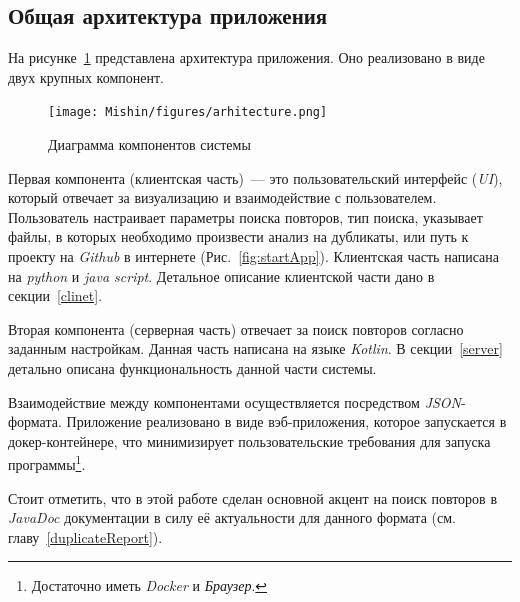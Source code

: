 

\subsection{Общая архитектура приложения}
На рисунке~\ref{fig:application} представлена архитектура приложения.
Оно реализовано в виде двух крупных компонент.

\begin{figure}[H]
    \texttt{[image: Mishin/figures/arhitecture.png]}
    \caption{Диаграмма компонентов системы}\label{fig:application}
\end{figure}


Первая компонента (клиентская часть)~--- это пользовательский интерфейс (\emph{UI}), который  отвечает за визуализацию и взаимодействие с пользователем.
Пользователь настраивает параметры поиска повторов, тип поиска, указывает файлы, в которых необходимо произвести анализ на дубликаты, или путь к проекту на \emph{Github} в интернете (Рис.~\ref{fig:startApp}).
Клиентская часть написана на \emph{python} и \emph{java script}.
Детальное описание клиентской части дано в секции~\ref{clinet}.

Вторая компонента (серверная часть) отвечает за поиск повторов согласно заданным настройкам.
Данная часть написана на языке \emph{Kotlin}.
В секции~\ref{server} детально описана функциональность данной части системы.

Взаимодействие между компонентами осуществляется посредством \emph{JSON}-формата.
Приложение реализовано в виде вэб-приложения, которое запускается в докер-контейнере, что минимизирует пользовательские требования для запуска программы\footnote{Достаточно иметь \emph{Docker} и \emph{Браузер}.}.




Стоит отметить, что в этой работе сделан основной акцент на поиск повторов в \emph{JavaDoc} документации в силу её актуальности для данного формата (см. главу~\ref{duplicateReport}).

